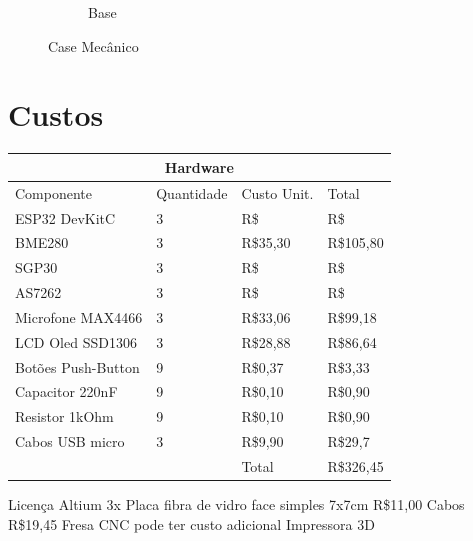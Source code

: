 \documentclass[../monografia.tex]{subfiles}
\begin{document}
\begin{figure}[h]
\begin{subfigure}{0.5\textwidth}
		\caption{Base}
		\label{fig:base-mec}
	\end{subfigure}
	\caption{Case Mecânico}
	\label{fig:mecanicas}
\end{figure}

\section{Custos}

\begin{tabular}{ |p{4.5cm}|p{2cm}|p{3cm}|p{3cm}|  }
	\hline
	\multicolumn{4}{|c|}{Hardware} \\
	\hline
	\hline
	Componente & Quantidade & Custo Unit. & Total\\
	\hline
	ESP32 DevKitC & 3 & R\$ & R\$ \\
	BME280 & 3 & R\$35,30 & R\$105,80 \\
	SGP30 & 3 & R\$ & R\$ \\
	AS7262 & 3 & R\$ & R\$ \\
	Microfone MAX4466 & 3 & R\$33,06 & R\$99,18 \\
	LCD Oled SSD1306 & 3 & R\$28,88 & R\$86,64 \\
	Botões Push-Button & 9 & R\$0,37 & R\$3,33 \\
	Capacitor 220nF & 9 & R\$0,10 & R\$0,90 \\
	Resistor 1kOhm & 9 & R\$0,10 & R\$0,90 \\
	Cabos USB micro & 3 & R\$9,90 & R\$29,7 \\
	\hline
	\multicolumn{2}{|c|}{ } & Total & R\$326,45 \\
	\hline
\end{tabular}

Licença Altium 
3x Placa fibra de vidro face simples 7x7cm R\$11,00
Cabos R\$19,45
Fresa CNC pode ter custo adicional
Impressora 3D 
\end{document}
